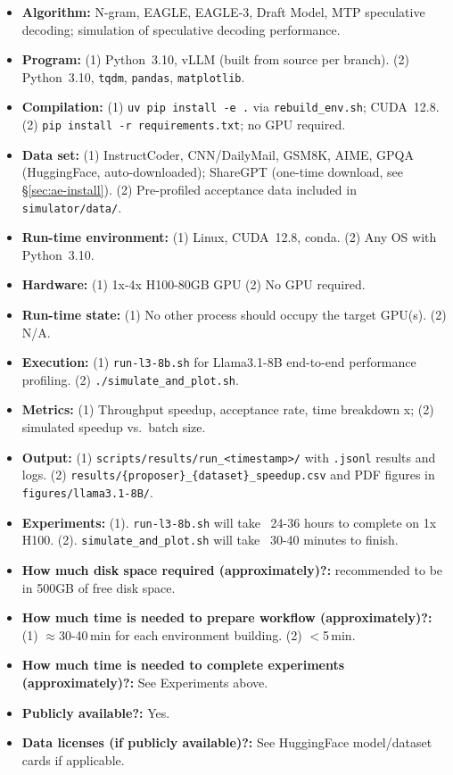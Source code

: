 {\small
\begin{itemize}
  \item {\bf Algorithm: } N-gram, EAGLE, EAGLE-3, Draft Model, MTP speculative decoding; simulation of speculative decoding performance.
  \item {\bf Program: } (1) Python~3.10, vLLM (built from source per branch). (2) Python~3.10, \texttt{tqdm}, \texttt{pandas}, \texttt{matplotlib}.
  \item {\bf Compilation: } (1) \texttt{uv pip install -e .} via \texttt{rebuild\_env.sh}; CUDA~12.8. (2) \texttt{pip install -r requirements.txt}; no GPU required.
  \item {\bf Data set: } (1) InstructCoder, CNN/DailyMail, GSM8K, AIME, GPQA (HuggingFace, auto-downloaded); ShareGPT (one-time download, see \S\ref{sec:ae-install}). (2) Pre-profiled acceptance data included in \texttt{simulator/data/}.
  \item {\bf Run-time environment: } (1) Linux, CUDA~12.8, conda. (2) Any OS with Python~3.10.
  \item {\bf Hardware: } (1) 1x-4x H100-80GB GPU (2) No GPU required.
  \item {\bf Run-time state: } (1) No other process should occupy the target GPU(s). (2) N/A.
  \item {\bf Execution: } (1) \texttt{run-l3-8b.sh} for Llama3.1-8B end-to-end performance profiling. (2) \texttt{./simulate\_and\_plot.sh}.
  \item {\bf Metrics: } (1) Throughput speedup, acceptance rate, time breakdown x; (2) simulated speedup vs.\ batch size.
  \item {\bf Output: } (1) \texttt{scripts/results/run\_<timestamp>/} with \texttt{.jsonl} results and logs. (2) \texttt{results/\{proposer\}\_\{dataset\}\_speedup.csv} and PDF figures in \texttt{figures/llama3.1-8B/}.
  \item {\bf Experiments: } (1). \texttt{run-l3-8b.sh} will take ~24-36 hours to complete on 1x H100. (2). \texttt{simulate\_and\_plot.sh} will take ~30-40 minutes to finish.
  \item {\bf How much disk space required (approximately)?: } recommended to be in 500GB of free disk space.
  \item {\bf How much time is needed to prepare workflow (approximately)?: } (1) $\approx$30-40\,min for each environment building. (2) $<$5\,min.
  \item {\bf How much time is needed to complete experiments (approximately)?: } See Experiments above.
  \item {\bf Publicly available?: } Yes.
  \item {\bf Data licenses (if publicly available)?: } See HuggingFace model/dataset cards if applicable.
\end{itemize}
}


